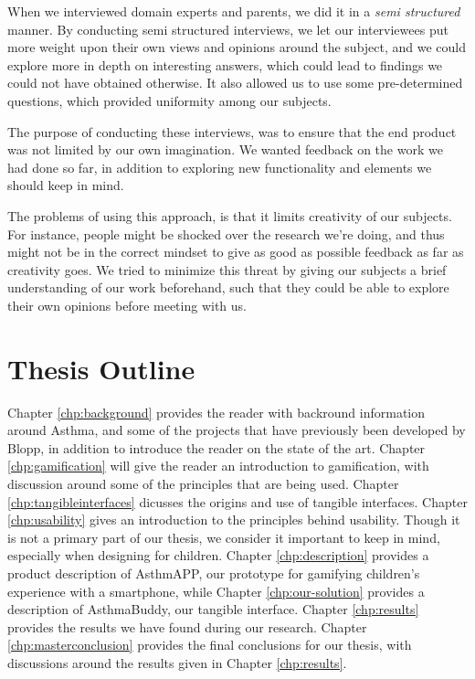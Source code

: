 When we interviewed domain experts and parents, we did it in a \emph{semi structured} manner. By conducting semi structured interviews, we let our interviewees put more weight upon their own views and opinions around the subject, and we could explore more in depth on interesting answers, which could lead to findings we could not have obtained otherwise. It also allowed us to use some pre-determined questions, which provided uniformity among our subjects.

The purpose of conducting these interviews, was to ensure that the end product was not limited by our own imagination. We wanted feedback on the work we had done so far, in addition to exploring new functionality and elements we should keep in mind. 

The problems of using this approach, is that it limits creativity of our subjects. For instance, people might be shocked over the research we're doing, and thus might not be in the correct mindset to give as good as possible feedback as far as creativity goes. We tried to minimize this threat by giving our subjects a brief understanding of our work beforehand, such that they could be able to explore their own opinions before meeting with us.


\section{Thesis Outline}
Chapter \ref{chp:background} provides the reader with backround information around Asthma, and some of the projects that have previously been developed by Blopp, in addition to introduce the reader on the state of the art. 
Chapter \ref{chp:gamification} will give the reader an introduction to gamification, with discussion around some of the principles that are being used. 
Chapter \ref{chp:tangibleinterfaces} dicusses the origins and use of tangible interfaces.
Chapter \ref{chp:usability} gives an introduction to the principles behind usability. Though it is not a primary part of our thesis, we consider it important to keep in mind, especially when designing for children.
Chapter \ref{chp:description} provides a product description of AsthmAPP, our prototype for gamifying children's experience with a smartphone, while Chapter \ref{chp:our-solution} provides a description of AsthmaBuddy, our tangible interface.
Chapter \ref{chp:results} provides the results we have found during our research.
Chapter \ref{chp:masterconclusion} provides the final conclusions for our thesis, with discussions around the results given in Chapter \ref{chp:results}.          
